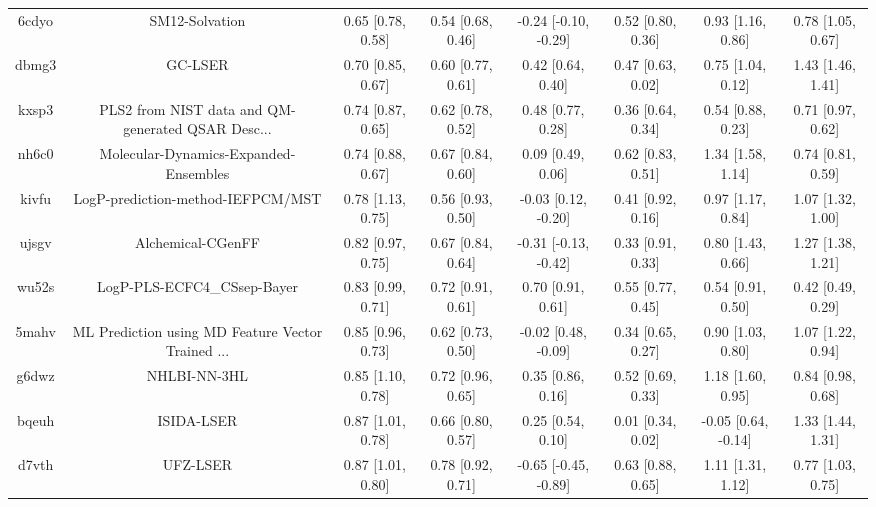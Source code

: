 \documentclass{article}
\begin{document}
\begin{center}
\begin{longtable}{|cccccccc|}
 6cdyo &                                     SM12-Solvation &  0.65 [0.78, 0.58] &  0.54 [0.68, 0.46] &  -0.24 [-0.10, -0.29] &  0.52 [0.80, 0.36] &     0.93 [1.16, 0.86] &     0.78 [1.05, 0.67] \\
 dbmg3 &                                            GC-LSER &  0.70 [0.85, 0.67] &  0.60 [0.77, 0.61] &     0.42 [0.64, 0.40] &  0.47 [0.63, 0.02] &     0.75 [1.04, 0.12] &     1.43 [1.46, 1.41] \\
 kxsp3 &  PLS2 from NIST data and QM-generated QSAR Desc... &  0.74 [0.87, 0.65] &  0.62 [0.78, 0.52] &     0.48 [0.77, 0.28] &  0.36 [0.64, 0.34] &     0.54 [0.88, 0.23] &     0.71 [0.97, 0.62] \\
 nh6c0 &              Molecular-Dynamics-Expanded-Ensembles &  0.74 [0.88, 0.67] &  0.67 [0.84, 0.60] &     0.09 [0.49, 0.06] &  0.62 [0.83, 0.51] &     1.34 [1.58, 1.14] &     0.74 [0.81, 0.59] \\
 kivfu &                  LogP-prediction-method-IEFPCM/MST &  0.78 [1.13, 0.75] &  0.56 [0.93, 0.50] &   -0.03 [0.12, -0.20] &  0.41 [0.92, 0.16] &     0.97 [1.17, 0.84] &     1.07 [1.32, 1.00] \\
 ujsgv &                                  Alchemical-CGenFF &  0.82 [0.97, 0.75] &  0.67 [0.84, 0.64] &  -0.31 [-0.13, -0.42] &  0.33 [0.91, 0.33] &     0.80 [1.43, 0.66] &     1.27 [1.38, 1.21] \\
 wu52s &                        LogP-PLS-ECFC4\_CSsep-Bayer &  0.83 [0.99, 0.71] &  0.72 [0.91, 0.61] &     0.70 [0.91, 0.61] &  0.55 [0.77, 0.45] &     0.54 [0.91, 0.50] &     0.42 [0.49, 0.29] \\
 5mahv &  ML Prediction using MD Feature Vector Trained ... &  0.85 [0.96, 0.73] &  0.62 [0.73, 0.50] &   -0.02 [0.48, -0.09] &  0.34 [0.65, 0.27] &     0.90 [1.03, 0.80] &     1.07 [1.22, 0.94] \\
 g6dwz &                                       NHLBI-NN-3HL &  0.85 [1.10, 0.78] &  0.72 [0.96, 0.65] &     0.35 [0.86, 0.16] &  0.52 [0.69, 0.33] &     1.18 [1.60, 0.95] &     0.84 [0.98, 0.68] \\
 bqeuh &                                         ISIDA-LSER &  0.87 [1.01, 0.78] &  0.66 [0.80, 0.57] &     0.25 [0.54, 0.10] &  0.01 [0.34, 0.02] &   -0.05 [0.64, -0.14] &     1.33 [1.44, 1.31] \\
 d7vth &                                           UFZ-LSER &  0.87 [1.01, 0.80] &  0.78 [0.92, 0.71] &  -0.65 [-0.45, -0.89] &  0.63 [0.88, 0.65] &     1.11 [1.31, 1.12] &     0.77 [1.03, 0.75] \\

\end{longtable}
\end{center}
\end{document}
